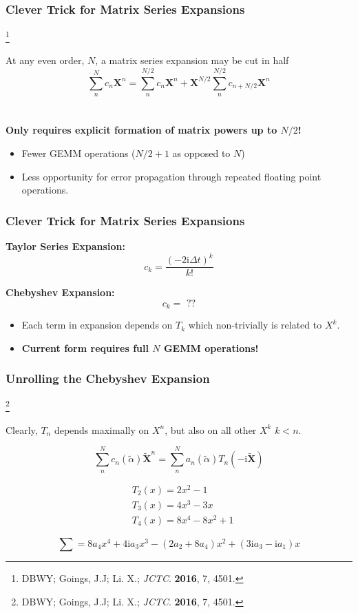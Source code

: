 \documentclass{beamer}
\newcommand\blfootnote[1]{%
  \begingroup
  \renewcommand\thefootnote{}\footnote{#1}%
  \addtocounter{footnote}{-1}%
  \endgroup
}
\begin{document}
\begin{frame}
\frametitle{Clever Trick for Matrix Series Expansions}
\blfootnote{DBWY; Goings, J.J; Li. X.; \emph{JCTC}. \textbf{2016}, 7, 4501.}

At any even order, $N$,  a matrix series expansion may be cut in half
\begin{equation*}
\sum_n^N c_n \mathbf{X}^n = \sum_n^{N/2} c_n \mathbf{X}^n + \mathbf{X}^{N/2}\sum_n^{N/2} c_{n+N/2}\mathbf{X}^n
\end{equation*}
~\\
~\\

{ \bf
Only requires explicit formation of matrix powers up to $N/2$!
}
\begin{itemize}
  \item Fewer GEMM operations ($N/2 + 1$ as opposed to $N$)
  \item Less opportunity for error propagation through repeated floating point operations.
\end{itemize}
\end{frame}


\begin{frame}
\frametitle{Clever Trick for Matrix Series Expansions}

\textbf{Taylor Series Expansion:}
\begin{equation*}
c_k = \frac{(-2\mathrm{i}\Delta t)^k}{k!}
\end{equation*}

\textbf{Chebyshev Expansion:}
\begin{equation*}
c_k = \text{ ??}
\end{equation*}
\begin{itemize}
  \item Each term in expansion depends on $T_k$ which non-trivially is related to $X^k$.
  \item \bf Current form requires full $N$ GEMM operations!
\end{itemize}
\end{frame}

\begin{frame}
\frametitle{Unrolling the Chebyshev Expansion}
\blfootnote{DBWY; Goings, J.J; Li. X.; \emph{JCTC}. \textbf{2016}, 7, 4501.}

Clearly, $T_n$ depends maximally on $X^n$, but also on all other $X^k$ $k < n$.

\begin{equation*}
\sum_n^N c_n(\tilde{\alpha}) \mathbf{\tilde{X}}^n = \sum_n^N  a_n(\tilde{\alpha})T_n(-\mathrm{i}\tilde{\mathbf{X}})
\end{equation*}

\begin{align*}
&T_2(x) = 2x^2 - 1\\
&T_3(x) = 4x^3 - 3x\\
&T_4(x) = 8x^4 - 8x^2 + 1
\end{align*}

\begin{equation*}
\sum = 8a_4x^4 + 4\mathrm{i}a_3x^3 - (2a_2 + 8a_4)x^2 + (3\mathrm{i}a_3 - \mathrm{i}a_1)x
\end{equation*}

\end{frame}
\end{document}
